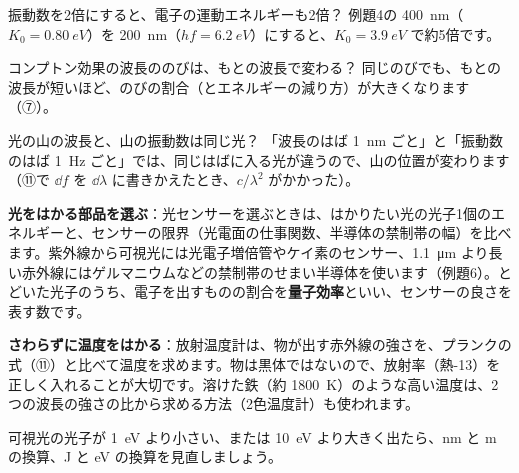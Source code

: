 \begin{tsumazuki}{振動数を2倍にすると、電子の運動エネルギーも2倍？}
例題4の \qty{400}{nm}（$K_0=\qty{0.80}{eV}$）を \qty{200}{nm}（$hf=\qty{6.2}{eV}$）にすると、$K_0=\qty{3.9}{eV}$ で約5倍です。
\end{tsumazuki}

\begin{tsumazuki}{コンプトン効果の波長ののびは、もとの波長で変わる？}
同じのびでも、もとの波長が短いほど、のびの割合（とエネルギーの減り方）が大きくなります（⑦）。
\end{tsumazuki}

\begin{tsumazuki}{光の山の波長と、山の振動数は同じ光？}
「波長のはば \qty{1}{nm} ごと」と「振動数のはば \qty{1}{Hz} ごと」では、同じはばに入る光が違うので、山の位置が変わります（⑪で $\dd f$ を $\dd\lambda$ に書きかえたとき、$c/\lambda^2$ がかかった）。
\end{tsumazuki}

\begin{phkougaku}
\textbf{光をはかる部品を選ぶ}：光センサーを選ぶときは、はかりたい光の光子1個のエネルギーと、センサーの限界（光電面の仕事関数、半導体の禁制帯の幅）を比べます。紫外線から可視光には光電子増倍管やケイ素のセンサー、\qty{1.1}{\micro m} より長い赤外線にはゲルマニウムなどの禁制帯のせまい半導体を使います（例題6）。とどいた光子のうち、電子を出すものの割合を\textbf{量子効率}といい、センサーの良さを表す数です。

\textbf{さわらずに温度をはかる}：放射温度計は、物が出す赤外線の強さを、プランクの式（⑪）と比べて温度を求めます。物は黒体ではないので、放射率（熱-13）を正しく入れることが大切です。溶けた鉄（約 \qty{1800}{K}）のような高い温度は、2つの波長の強さの比から求める方法（2色温度計）も使われます。

\begin{phketa}[光と光子の数の目安]
可視光の光子が \qty{1}{eV} より小さい、または \qty{10}{eV} より大きく出たら、nm と m の換算、J と eV の換算を見直しましょう。
\end{phketa}
\end{phkougaku}

